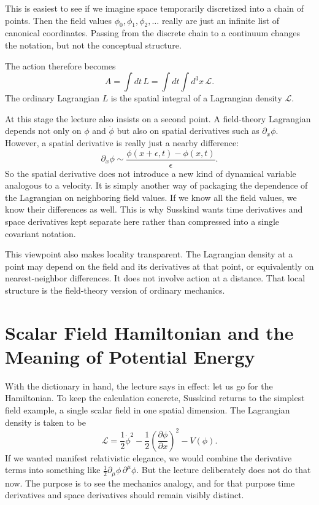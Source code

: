 This is easiest to see if we imagine space temporarily discretized into a chain of points. Then the field values \(\phi_0,\phi_1,\phi_2,\dots\) really are just an infinite list of canonical coordinates. Passing from the discrete chain to a continuum changes the notation, but not the conceptual structure.

The action therefore becomes
\begin{equation}
A=\int dt\,L=\int dt\int d^3x\,\mathcal L.
\end{equation}
The ordinary Lagrangian \(L\) is the spatial integral of a Lagrangian density \(\mathcal L\).

At this stage the lecture also insists on a second point. A field-theory Lagrangian depends not only on \(\phi\) and \(\dot\phi\) but also on spatial derivatives such as \(\partial_x\phi\). However, a spatial derivative is really just a nearby difference:
\begin{equation}
\partial_x\phi \sim \frac{\phi(x+\epsilon,t)-\phi(x,t)}{\epsilon}.
\end{equation}
So the spatial derivative does not introduce a new kind of dynamical variable analogous to a velocity. It is simply another way of packaging the dependence of the Lagrangian on neighboring field values. If we know all the field values, we know their differences as well. This is why Susskind wants time derivatives and space derivatives kept separate here rather than compressed into a single covariant notation.

This viewpoint also makes locality transparent. The Lagrangian density at a point may depend on the field and its derivatives at that point, or equivalently on nearest-neighbor differences. It does not involve action at a distance. That local structure is the field-theory version of ordinary mechanics.

\section{Scalar Field Hamiltonian and the Meaning of Potential Energy}

With the dictionary in hand, the lecture says in effect: let us go for the Hamiltonian. To keep the calculation concrete, Susskind returns to the simplest field example, a single scalar field in one spatial dimension. The Lagrangian density is taken to be
\begin{equation}
\mathcal L=\frac12\dot\phi^2-\frac12\left(\frac{\partial\phi}{\partial x}\right)^2-V(\phi).
\end{equation}
If we wanted manifest relativistic elegance, we would combine the derivative terms into something like \(\frac12\partial_\mu\phi\,\partial^\mu\phi\). But the lecture deliberately does not do that now. The purpose is to see the mechanics analogy, and for that purpose time derivatives and space derivatives should remain visibly distinct.


